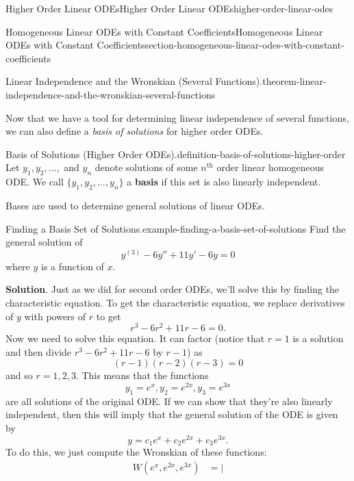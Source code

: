 \documentclass[oneside,10pt,]{book}
\newcommand{\terminology}[1]{\textbf{#1}}
\numberwithin{equation}{section}
\newcommand{\amp}{&}
\begin{document}
\begin{chapterptx}{Higher Order Linear ODEs}{}{Higher Order Linear ODEs}{}{}{higher-order-linear-odes}
\begin{sectionptx}{Homogeneous Linear ODEs with Constant Coefficients}{}{Homogeneous Linear ODEs with Constant Coefficients}{}{}{section-homogeneous-linear-odes-with-constant-coefficients}
\begin{theorem}{Linear Independence and the Wronskian (Several Functions).}{}{theorem-linear-independence-and-the-wronskian-several-functions}
\end{theorem}
\hypertarget{p-264}{}%
Now that we have a tool for determining linear independence of several functions, we can also define a \emph{basis of solutions} for higher order ODEs.%
\begin{definition}{Basis of Solutions (Higher Order ODEs).}{definition-basis-of-solutions-higher-order}%
\hypertarget{p-265}{}%
Let \(y_{1}, y_{2},\ldots,\) and \(y_{n}\) denote solutions of some \(n^{\text{th}}\) order linear homogeneous ODE. We call \(\{y_{1},y_{2},\ldots,y_{n}\}\) a \terminology{basis} if this set is also linearly independent.%
\end{definition}
\hypertarget{p-266}{}%
Bases are used to determine general solutions of linear ODEs.%
\begin{example}{Finding a Basis Set of Solutions.}{example-finding-a-basis-set-of-solutions}%
\hypertarget{p-267}{}%
Find the general solution of%
\begin{equation*}
y^{(3)}-6y''+11y'-6y=0
\end{equation*}
where \(y\) is a function of \(x\).%
\par\smallskip%
\noindent\textbf{Solution}.\hypertarget{solution-38}{}\quad%
\hypertarget{p-268}{}%
Just as we did for second order ODEs, we'll solve this by finding the characteristic equation. To get the characteristic equation, we replace derivatives of \(y\) with powers of \(r\) to get%
\begin{equation*}
r^{3}-6r^{2}+11r-6=0.
\end{equation*}
Now we need to solve this equation. It can factor (notice that \(r=1\) is a solution and then divide \(r^{3}-6r^{2}+11r-6\) by \(r-1\)) as%
\begin{equation*}
(r-1)(r-2)(r-3)=0
\end{equation*}
and so \(r=1,2,3.\) This means that the functions%
\begin{equation*}
y_{1} = e^{x},y_{2} = e^{2x},y_{3} = e^{3x}
\end{equation*}
are all solutions of the original ODE. If we can show that they're also linearly independent, then this will imply that the general solution of the ODE is given by%
\begin{equation*}
y = c_{1}e^{x}+c_{2}e^{2x}+c_{3}e^{3x}.
\end{equation*}
To do this, we just compute the Wronskian of these functions:%
%
\begin{align*}
W(e^{x},e^{2x},e^{3x})
\amp= \left|

\end{align*}
\end{example}
\end{sectionptx}
\end{chapterptx}
\end{document}
